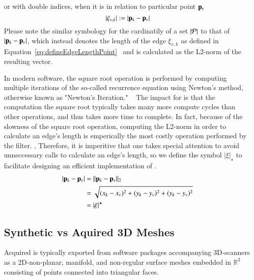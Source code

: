or with double indices, when it is in relation to particular point $\mathbf{p}_v$
\begin{equation}
	|\xi_{v,k}| := |\mathbf{p}_k - \mathbf{p}_v|
	\label{eq:defineEdgeLengthPoint}
\end{equation}%
%
Please note the similar symbology for the cardinatily of a set $|\mathcal{P}|$ to that of $|\mathbf{p}_k - \mathbf{p}_v|$, which instead denotes the length of the edge $\xi_{v,k}$ as defined in Equation~\ref{eq:defineEdgeLengthPoint}~\cite[p.~26]{Mara12} and is calculated as the L2-norm of the resulting vector.

In modern software, the square root operation is performed by computing multiple iterations of the so-called recurrence equation using Newton's method, otherwise known as "Newton's Iteration." ~\cite{Weisstein19b} The impact for  is that the computation the square root typically takes many more compute cycles than other operations, and thus takes more time to complete. In fact, because of the slowness of the square root operation, computing the L2-norm in order to calculate an edge's length is emperically the most costly operation performed by the filter. , Therefore, it is imperitive that one takes special attention to avoid unneccessary calls to calculate an edge's length, so we define the symbol $|\xi|_\star$ to facilitate designing an efficient implementation of .
%
\begin{align}
	|\mathbf{p}_k - \mathbf{p}_v| & = \lVert\mathbf{p}_k - \mathbf{p}_v\rVert_2 \\
					& = \sqrt{(x_k-x_v)^2 + (y_k-y_v)^2 + (y_k-y_v)^2} \\
					& = |\xi|^\star
	\label{eq:defineEdgeLengthCalc}
\end{align}
%
\subsection{Synthetic vs Aquired 3D Meshes}
\label{chBsSvA}

Acquired \tdd{} is typically exported from software packages accompanying 3D-scanners as a 2D-non-planar, manifold, and non-regular surface meshes embedded in $\mathbb{R}^3$ consisting of points connected into triangular faces.


